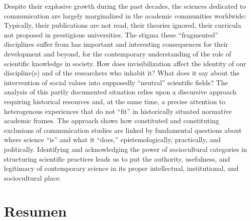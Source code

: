 \documentclass{tufte-handout}
\begin{document}
\begin{titlepage}

\noindent Despite their explosive growth during the past decades, the sciences
dedicated to communication are largely marginalized in the academic
communities worldwide: Typically, their publications are not read, their
theories ignored, their curricula not proposed in prestigious
universities. The stigma these ``fragmented'' disciplines suffer from
has important and interesting consequences for their development and
beyond, for the contemporary understanding of the role of scientific
knowledge in society. How does invisibilization affect the identity of
our discipline(s) and of the researchers who inhabit it? What does it
say about the intervention of social values into supposedly ``neutral''
scientific fields? The analysis of this partly documented situation
relies upon a discursive approach requiring historical resources and, at
the same time, a precise attention to heterogenous experiences that do
not ``fit'' in historically situated normative academic frames. The
approach shows how constituted and constituting exclusions of
communication studies are linked by fundamental questions about where
science ``is'' and what it ``does,'' epistemologically, practically, and
politically. Identifying and acknowledging the power of sociocultural
categories in structuring scientific practices leads us to put the
authority, usefulness, and legitimacy of contemporary science in its
proper intellectual, institutional, and sociocultural place.





\enlargethispage{2\baselineskip}

\vspace*{5em}




\end{titlepage}
 
\hypertarget{resumen}{%
\section{Resumen}\label{resumen}}
\end{document}
